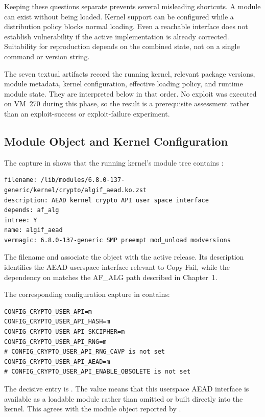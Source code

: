Keeping these questions separate prevents several misleading shortcuts. A
module can exist without being loaded. Kernel support can be configured while a
distribution policy blocks normal loading. Even a reachable interface does not
establish vulnerability if the active implementation is already corrected.
Suitability for reproduction depends on the combined state, not on a single
command or version string.

The seven textual artifacts record the running kernel, relevant package
versions, module metadata, kernel configuration, effective loading policy, and
runtime module state. They are interpreted below in that order. No exploit was
executed on VM~270 during this phase, so the result is a prerequisite assessment
rather than an exploit-success or exploit-failure experiment.

\clearpage

\subsection{Module Object and Kernel Configuration}

The capture in  shows that the running kernel's
module tree contains :

\begin{lstlisting}
filename: /lib/modules/6.8.0-137-generic/kernel/crypto/algif_aead.ko.zst
description: AEAD kernel crypto API user space interface
depends: af_alg
intree: Y
name: algif_aead
vermagic: 6.8.0-137-generic SMP preempt mod_unload modversions
\end{lstlisting}

The filename and  associate the object with the active
 release. Its description identifies the AEAD
userspace interface relevant to Copy Fail, while the dependency on
 matches the AF\_ALG path described in Chapter~1.

The corresponding configuration capture in 
contains:

\begin{lstlisting}
CONFIG_CRYPTO_USER_API=m
CONFIG_CRYPTO_USER_API_HASH=m
CONFIG_CRYPTO_USER_API_SKCIPHER=m
CONFIG_CRYPTO_USER_API_RNG=m
# CONFIG_CRYPTO_USER_API_RNG_CAVP is not set
CONFIG_CRYPTO_USER_API_AEAD=m
# CONFIG_CRYPTO_USER_API_ENABLE_OBSOLETE is not set
\end{lstlisting}

The decisive entry is . The value
 means that this userspace AEAD interface is available as a loadable
module rather than omitted or built directly into the kernel. This agrees with
the module object reported by .

